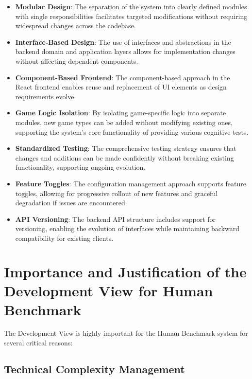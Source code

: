 \begin{itemize}
    \item \textbf{Modular Design}: The separation of the system into clearly defined modules with single responsibilities facilitates targeted modifications without requiring widespread changes across the codebase.
    
    \item \textbf{Interface-Based Design}: The use of interfaces and abstractions in the backend domain and application layers allows for implementation changes without affecting dependent components.
    
    \item \textbf{Component-Based Frontend}: The component-based approach in the React frontend enables reuse and replacement of UI elements as design requirements evolve.
    
    \item \textbf{Game Logic Isolation}: By isolating game-specific logic into separate modules, new game types can be added without modifying existing ones, supporting the system's core functionality of providing various cognitive tests.
    
    \item \textbf{Standardized Testing}: The comprehensive testing strategy ensures that changes and additions can be made confidently without breaking existing functionality, supporting ongoing evolution.
    
    \item \textbf{Feature Toggles}: The configuration management approach supports feature toggles, allowing for progressive rollout of new features and graceful degradation if issues are encountered.
    
    \item \textbf{API Versioning}: The backend API structure includes support for versioning, enabling the evolution of interfaces while maintaining backward compatibility for existing clients.
\end{itemize}

\section{Importance and Justification of the Development View for Human Benchmark}

The Development View is highly important for the Human Benchmark system for several critical reasons:

\subsection{Technical Complexity Management}

